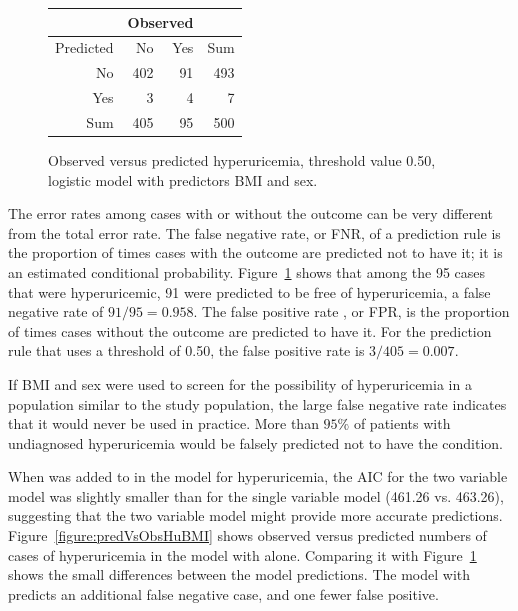 \begin{figure}[ht]
\centering
\begin{tabular}{rrrr}
  \hline
  & \multicolumn{2}{c}{Observed} & \\
  \hline
 Predicted& No & Yes & Sum \\ 
  \hline
No & 402 & 91 & 493 \\ 
Yes & 3 & 4 & 7 \\ 
  Sum & 405 & 95 & 500 \\ 
   \hline
\end{tabular}
\caption{Observed versus predicted hyperuricemia, 
       threshold value 0.50, logistic model with predictors BMI and sex.} 
\label{figure:predVsObsHuBMISex}
\end{figure}

The error rates among cases with or without the outcome can be very different from the total error rate. The false negative rate, or FNR, of a prediction rule is the proportion of times cases with the outcome are predicted not to have it; it is an estimated conditional probability.  Figure~\ref{figure:predVsObsHuBMISex} shows that among the 95 cases that were hyperuricemic, 91 were predicted to be free of hyperuricemia, a false negative rate of $91/95 = 0.958$. The false positive rate , or FPR, is the proportion of times cases without the outcome are predicted to have it. For the prediction rule that uses a threshold of 0.50, the false positive rate is $3/405 = 0.007$.   

If BMI and sex were used to screen for the possibility of hyperuricemia in a population similar to the study population, the large false negative rate indicates that it would never be used in practice.  More than $95\%$ of patients with undiagnosed hyperuricemia would be falsely predicted not to have the condition.

When  was added to  in the model for hyperuricemia, the AIC for the two variable model was slightly smaller than for the single variable model (461.26 vs. 463.26), suggesting that the two variable model might provide more accurate predictions.  Figure~\ref{figure:predVsObsHuBMI} shows observed versus predicted numbers of cases of hyperuricemia in the model with  alone.  Comparing it with Figure~\ref{figure:predVsObsHuBMISex} shows the small differences between the model predictions. The model with  predicts an additional false negative case, and one fewer false positive. 

